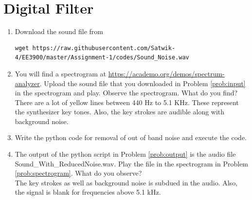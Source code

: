 \documentclass[journal,12pt,twocolumn]{IEEEtran}
\renewcommand\thesection{\arabic{section}}
\begin{document}
\section{Digital Filter}
\begin{enumerate}[label=\thesection.\arabic*
,ref=\thesection.\theenumi]
\item
\label{prob:input}
Download the sound file from  
\begin{lstlisting}
wget https://raw.githubusercontent.com/Satwik-4/EE3900/master/Assignment-1/codes/Sound_Noise.wav
\end{lstlisting}
\item
\label{prob:spectrogram}
You will find a spectrogram at \href{https://academo.org/demos/spectrum-analyzer}{\url{https://academo.org/demos/spectrum-analyzer}}. 
%
Upload the sound file that you downloaded in Problem \ref{prob:input} in the spectrogram  and play.  Observe the spectrogram. What do you find?
\\
%
\solution There are a lot of yellow lines between 440 Hz to 5.1 KHz.  These represent the synthesizer key tones. Also, the key strokes
are audible along with background noise.
\item
\label{prob:output}
Write the python code for removal of out of band noise and execute the code.
\\
\solution

% 
\item
The output of the python script in Problem \ref{prob:output} is the audio file Sound\_With\_ReducedNoise.wav. Play the file in the spectrogram in Problem \ref{prob:spectrogram}. What do you observe?
\\
\solution The key strokes as well as background noise is subdued in the audio.  Also,  the signal is blank for frequencies above 5.1 kHz.

\end{enumerate}
\end{document}
